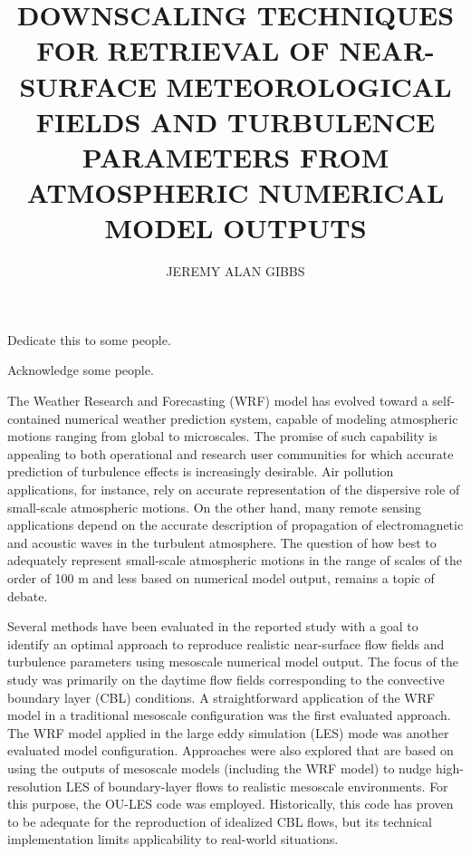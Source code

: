 \documentclass[letter,12pt,dissertation]{OUdissertation6}
\begin{document}
\title{DOWNSCALING TECHNIQUES FOR RETRIEVAL OF NEAR-SURFACE METEOROLOGICAL FIELDS AND TURBULENCE PARAMETERS FROM ATMOSPHERIC NUMERICAL MODEL OUTPUTS}
\author{JEREMY ALAN GIBBS}
\begin{preface}
Dedicate this to some people.

Acknowledge some people.

\tableofcontents
\listoftables
\listoffigures
{}
The Weather Research and Forecasting (WRF) model has evolved toward a self-contained numerical weather prediction system, capable of modeling atmospheric motions ranging from global to microscales. The promise of such capability is appealing to both operational and research user communities for which accurate prediction of turbulence effects is increasingly desirable. Air pollution applications, for instance, rely on accurate representation of the dispersive role of small-scale atmospheric motions. On the other hand, many remote sensing applications depend on the accurate description of propagation of electromagnetic and acoustic waves in the turbulent atmosphere. The question of how best to adequately represent small-scale atmospheric motions in the range of scales of the order of 100 m and less based on numerical model output, remains a topic of debate.

Several methods have been evaluated in the reported study with a goal to identify an optimal approach to reproduce realistic near-surface flow fields and turbulence parameters using mesoscale numerical model output. The focus of the study was primarily on the daytime flow fields corresponding to the convective boundary layer (CBL) conditions. A straightforward application of the WRF model in a traditional mesoscale configuration was the first evaluated approach. The WRF model applied in the large eddy simulation (LES) mode was another evaluated model configuration. Approaches were also explored that are based on using the outputs of mesoscale models (including the WRF model) to nudge high-resolution LES of boundary-layer flows to realistic mesoscale environments. For this purpose, the OU-LES code was employed. Historically, this code has proven to be adequate for the reproduction of idealized CBL flows, but its technical implementation limits applicability to real-world situations.


\end{preface}
\end{document}

